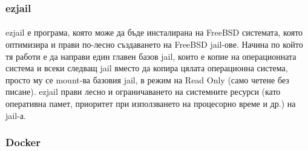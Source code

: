 \documentclass[pdftex,14pt,a4paper]{extreport}
\begin{document}
\subsubsection {ezjail}
\paragraph {}
ezjail е програма, която може да бъде инсталирана на FreeBSD системата, която оптимизира и прави по-лесно създаването на FreeBSD jail-ове. Начина по който тя работи е да направи един главен базов jail, които е копие на операционната система и всеки следващ jail вместо да копира цялата операционна система, просто му се mount-ва базовия jail, в режим на Read Only (само четене без писане). ezjail прави лесно и ограничаването на системните ресурси (като оперативна памет, приоритет при използването на процесорно време и др.) на jail-а.
\subsubsection {Docker}
\end{document}
